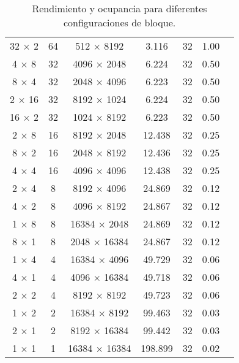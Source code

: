 \begin{table}[H]
\begin{adjustbox}{width=\textwidth, keepaspectratio}
\begin{tabular}{ccccccc}
                32 $\times$ 2   & 64   & 512 $\times$ 8192   & 3.116  & 32  & 1.00 \\
                4 $\times$ 8    & 32   & 4096 $\times$ 2048  & 6.224  & 32  & 0.50 \\
                8 $\times$ 4    & 32   & 2048 $\times$ 4096  & 6.223  & 32  & 0.50 \\
                2 $\times$ 16   & 32   & 8192 $\times$ 1024  & 6.224  & 32  & 0.50 \\
                16 $\times$ 2   & 32   & 1024 $\times$ 8192  & 6.223  & 32  & 0.50 \\
                2 $\times$ 8    & 16   & 8192 $\times$ 2048  & 12.438 & 32  & 0.25 \\
                8 $\times$ 2    & 16   & 2048 $\times$ 8192  & 12.436 & 32  & 0.25 \\
                4 $\times$ 4    & 16   & 4096 $\times$ 4096  & 12.438 & 32  & 0.25 \\
                2 $\times$ 4    & 8    & 8192 $\times$ 4096  & 24.869 & 32  & 0.12 \\
                4 $\times$ 2    & 8    & 4096 $\times$ 8192  & 24.867 & 32  & 0.12 \\
                1 $\times$ 8    & 8    & 16384 $\times$ 2048 & 24.869 & 32  & 0.12 \\
                8 $\times$ 1    & 8    & 2048 $\times$ 16384 & 24.867 & 32  & 0.12 \\
                1 $\times$ 4    & 4    & 16384 $\times$ 4096 & 49.729 & 32  & 0.06 \\
                4 $\times$ 1    & 4    & 4096 $\times$ 16384 & 49.718 & 32  & 0.06 \\
                2 $\times$ 2    & 4    & 8192 $\times$ 8192  & 49.723 & 32  & 0.06 \\
                1 $\times$ 2    & 2    & 16384 $\times$ 8192 & 99.463 & 32  & 0.03 \\
                2 $\times$ 1    & 2    & 8192 $\times$ 16384 & 99.442 & 32  & 0.03 \\
                1 $\times$ 1    & 1    & 16384 $\times$ 16384 & 198.899 & 32 & 0.02 \\
                \bottomrule
            \end{tabular}
        \end{adjustbox}
        \caption{Rendimiento y ocupancia para diferentes configuraciones de bloque.}
        \label{tab:resultados}
    \end{table}
    
